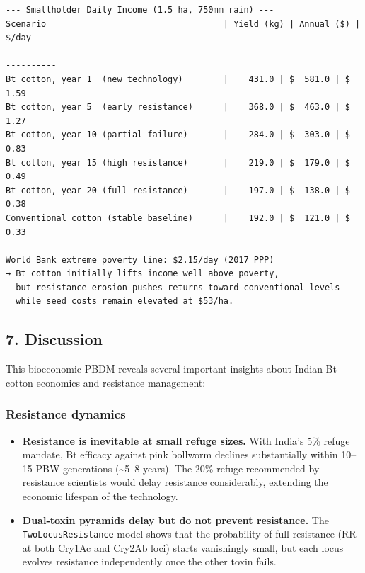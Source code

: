 \begin{verbatim}
--- Smallholder Daily Income (1.5 ha, 750mm rain) ---
Scenario                                   | Yield (kg) | Annual ($) | $/day
--------------------------------------------------------------------------------
Bt cotton, year 1  (new technology)        |    431.0 | $  581.0 | $ 1.59
Bt cotton, year 5  (early resistance)      |    368.0 | $  463.0 | $ 1.27
Bt cotton, year 10 (partial failure)       |    284.0 | $  303.0 | $ 0.83
Bt cotton, year 15 (high resistance)       |    219.0 | $  179.0 | $ 0.49
Bt cotton, year 20 (full resistance)       |    197.0 | $  138.0 | $ 0.38
Conventional cotton (stable baseline)      |    192.0 | $  121.0 | $ 0.33

World Bank extreme poverty line: $2.15/day (2017 PPP)
→ Bt cotton initially lifts income well above poverty,
  but resistance erosion pushes returns toward conventional levels
  while seed costs remain elevated at $53/ha.
\end{verbatim}



\subsection{7. Discussion}



\label{10105094932200464853}{}


This bioeconomic PBDM reveals several important insights about Indian Bt cotton economics and resistance management:



\subsubsection{Resistance dynamics}



\label{2566249186827682038}{}


\begin{itemize}
\item[1. ] \textbf{Resistance is inevitable at small refuge sizes.} With India’s 5\%  refuge mandate, Bt efficacy against pink bollworm declines  substantially within 10–15 PBW generations ({\textasciitilde}5–8 years). The 20\%  refuge recommended by resistance scientists would delay resistance  considerably, extending the economic lifespan of the technology.


\item[2. ] \textbf{Dual-toxin pyramids delay but do not prevent resistance.} The  \texttt{TwoLocusResistance} model shows that the probability of full  resistance (RR at both Cry1Ac and Cry2Ab loci) starts vanishingly  small, but each locus evolves resistance independently once the  other toxin fails.

\end{itemize}


